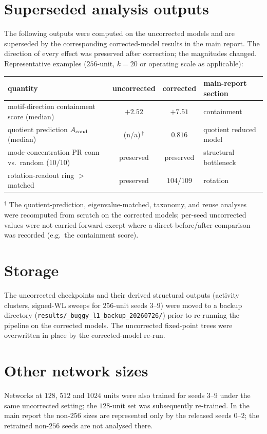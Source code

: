 \documentclass[11pt]{article}
\begin{document}
\section{Superseded analysis outputs}
The following outputs were computed on the uncorrected models and are superseded by the
corresponding corrected-model results in the main report. The direction of every effect was
preserved after correction; the magnitudes changed. Representative examples ($256$-unit,
$k=20$ or operating scale as applicable):

\begin{center}
\begin{tabular}{lccl}
\toprule
quantity & uncorrected & corrected & main-report section \\
\midrule
motif-direction containment score (median)     & $+2.52$ & $+7.51$ & containment \\
quotient prediction $A_{\rm cond}$ (median)     & (n/a)\,$^{\dagger}$ & $0.816$ & quotient reduced model \\
mode-concentration PR conn vs.\ random ($10/10$) & preserved & preserved & structural bottleneck \\
rotation-readout ring $>$ matched               & preserved & $104/109$ & rotation \\
\bottomrule
\end{tabular}
\end{center}
{\footnotesize $^{\dagger}$ The quotient-prediction, eigenvalue-matched, taxonomy, and reuse
analyses were recomputed from scratch on the corrected models; per-seed uncorrected values were
not carried forward except where a direct before/after comparison was recorded (e.g.\ the
containment score).}

\section{Storage}
The uncorrected checkpoints and their derived structural outputs (activity clusters, signed-WL
sweeps for $256$-unit seeds $3$--$9$) were moved to a backup directory
(\texttt{results/\_buggy\_l1\_backup\_20260726/}) prior to re-running the pipeline on the
corrected models. The uncorrected fixed-point trees were overwritten in place by the
corrected-model re-run.

\section{Other network sizes}
Networks at $128$, $512$ and $1024$ units were also trained for seeds $3$--$9$ under the same
uncorrected setting; the $128$-unit set was subsequently re-trained. In the main report the
non-$256$ sizes are represented only by the released seeds $0$--$2$; the retrained non-$256$
seeds are not analysed there.
\end{document}
